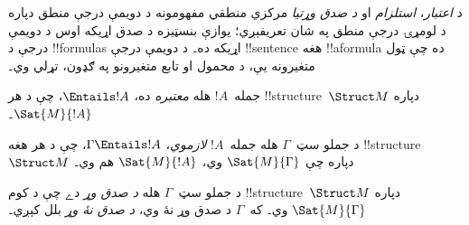 \documentclass[../../../include/open-logic-section]{subfiles}
\begin{document}

\begin{explain}
د \emph{اعتبار}، \emph{استلزام} او \emph{د صدق وړتيا} مرکزي منطقي
مفهومونه د دويمې درجې منطق دپاره د لومړۍ درجې منطق په شان تعريفېږي؛
يوازې بنسټيزه د صدق اړيکه اوس د دويمې درجې د !!{formula}s اړيکه ده۔
د دويمې درجې !!{sentence} هغه !!a{formula} ده چې ټول متغيرونه
يې، د محمول او تابع متغيرونو په ګډون، تړلي وي۔
\end{explain}

\begin{defn}[اعتبار]
جمله~$!A$ هله \emph{معتبره} ده، $\Entails !A$، چې د هر
!!{structure}~$\Struct M$ دپاره $\Sat{M}{!A}$۔
\end{defn}

\begin{defn}[استلزام]
د جملو سټ~$\Gamma$ هله جمله~$!A$ \emph{لازموي}، $\Gamma
\Entails !A$، چې د هر هغه !!{structure}~$\Struct M$ دپاره چې
$\Sat{M}{\Gamma}$ وي، $\Sat{M}{!A}$ هم وي۔
\end{defn}

\begin{defn}
د جملو سټ~$\Gamma$ هله \emph{د صدق وړ} دے چې د کوم
!!{structure}~$\Struct M$ دپاره $\Sat{M}{\Gamma}$ وي۔ که~$\Gamma$
د صدق وړ نۀ وي، \emph{د صدق نۀ وړ} بلل کېږي۔
\end{defn}
\end{document}
